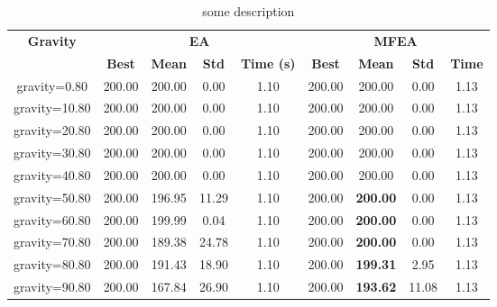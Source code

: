 \begin{table}
    \begin{center}
    \begin{tabular}{|c|c|c|c|c|c|c|c|c|}
    \hline
    \multirow{2}{*}{\textbf{Gravity}} & \multicolumn{4}{c|}{\textbf{EA}} & \multicolumn{4}{c|}{\textbf{MFEA}} \\ \cline{2-9} 
                      & \textbf{Best} & \textbf{Mean} & \textbf{Std} & \textbf{Time (s)} & \textbf{Best} & \textbf{Mean} & \textbf{Std} & \textbf{Time} \\ \hline
    gravity=0.80 & 200.00 & 200.00 & 0.00 & 1.10 & 200.00 & 200.00 & 0.00 & 1.13 \\
    gravity=10.80 & 200.00 & 200.00 & 0.00 & 1.10 & 200.00 & 200.00 & 0.00 & 1.13 \\
    gravity=20.80 & 200.00 & 200.00 & 0.00 & 1.10 & 200.00 & 200.00 & 0.00 & 1.13 \\
    gravity=30.80 & 200.00 & 200.00 & 0.00 & 1.10 & 200.00 & 200.00 & 0.00 & 1.13 \\
    gravity=40.80 & 200.00 & 200.00 & 0.00 & 1.10 & 200.00 & 200.00 & 0.00 & 1.13 \\
    gravity=50.80 & 200.00 & 196.95 & 11.29 & 1.10 & 200.00 & \textbf{200.00} & 0.00 & 1.13 \\
    gravity=60.80 & 200.00 & 199.99 & 0.04 & 1.10 & 200.00 & \textbf{200.00} & 0.00 & 1.13 \\
    gravity=70.80 & 200.00 & 189.38 & 24.78 & 1.10 & 200.00 & \textbf{200.00} & 0.00 & 1.13 \\
    gravity=80.80 & 200.00 & 191.43 & 18.90 & 1.10 & 200.00 & \textbf{199.31} & 2.95 & 1.13 \\
    gravity=90.80 & 200.00 & 167.84 & 26.90 & 1.10 & 200.00 & \textbf{193.62} & 11.08 & 1.13 \\
        \hline
    \end{tabular}
    \end{center}
    \caption{some description}
    \label{tab:result:cartpole}
\end{table}